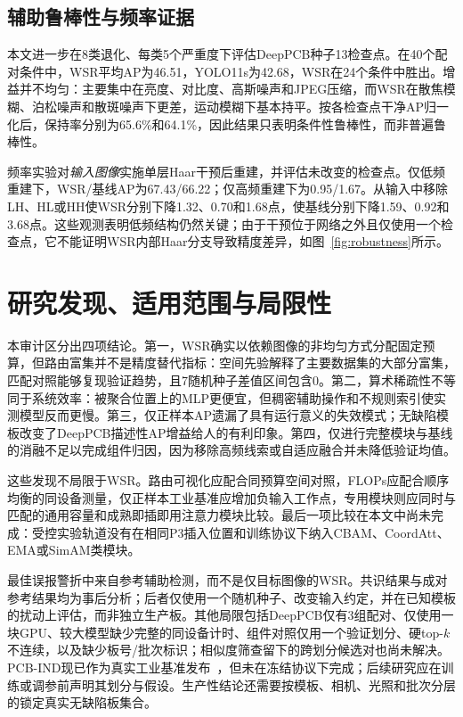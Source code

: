 \documentclass[conference]{IEEEtran}
\begin{document}
\subsection{辅助鲁棒性与频率证据}
本文进一步在8类退化、每类5个严重度下评估DeepPCB种子13检查点。在40个配对条件中，WSR平均AP为46.51，YOLO11s为42.68，WSR在24个条件中胜出。增益并不均匀：主要集中在亮度、对比度、高斯噪声和JPEG压缩，而WSR在散焦模糊、泊松噪声和散斑噪声下更差，运动模糊下基本持平。按各检查点干净AP归一化后，保持率分别为65.6\%和64.1\%，因此结果只表明条件性鲁棒性，而非普遍鲁棒性。

频率实验对\emph{输入图像}实施单层Haar干预后重建，并评估未改变的检查点。仅低频重建下，WSR/基线AP为67.43/66.22；仅高频重建下为0.95/1.67。从输入中移除LH、HL或HH使WSR分别下降1.32、0.70和1.68点，使基线分别下降1.59、0.92和3.68点。这些观测表明低频结构仍然关键；由于干预位于网络之外且仅使用一个检查点，它不能证明WSR内部Haar分支导致精度差异，如图~\ref{fig:robustness}所示。

\section{研究发现、适用范围与局限性}
本审计区分出四项结论。第一，WSR确实以依赖图像的非均匀方式分配固定预算，但路由富集并不是精度替代指标：空间先验解释了主要数据集的大部分富集，匹配对照能够复现验证趋势，且7随机种子差值区间包含0。第二，算术稀疏性不等同于系统效率：被聚合位置上的MLP更便宜，但稠密辅助操作和不规则索引使实测模型反而更慢。第三，仅正样本AP遗漏了具有运行意义的失效模式；无缺陷模板改变了DeepPCB描述性AP增益给人的有利印象。第四，仅进行完整模块与基线的消融不足以完成组件归因，因为移除高频线索或自适应融合并未降低验证均值。

这些发现不局限于WSR。路由可视化应配合同预算空间对照，FLOPs应配合顺序均衡的同设备测量，仅正样本工业基准应增加负输入工作点，专用模块则应同时与匹配的通用容量和成熟即插即用注意力模块比较。最后一项比较在本文中尚未完成：受控实验轨道没有在相同P3插入位置和训练协议下纳入CBAM、CoordAtt、EMA或SimAM类模块。

最佳误报警折中来自参考辅助检测，而不是仅目标图像的WSR。共识结果与成对参考结果均为事后分析；后者仅使用一个随机种子、改变输入约定，并在已知模板的扰动上评估，而非独立生产板。其他局限包括DeepPCB仅有3组配对、仅使用一块GPU、较大模型缺少完整的同设备计时、组件对照仅用一个验证划分、硬top-$k$不连续，以及缺少板号/批次标识；相似度筛查留下的跨划分候选对也尚未解决。PCB-IND现已作为真实工业基准发布~\cite{pcbind}，但未在冻结协议下完成；后续研究应在训练或调参前声明其划分与假设。生产性结论还需要按模板、相机、光照和批次分层的锁定真实无缺陷板集合。
\end{document}
